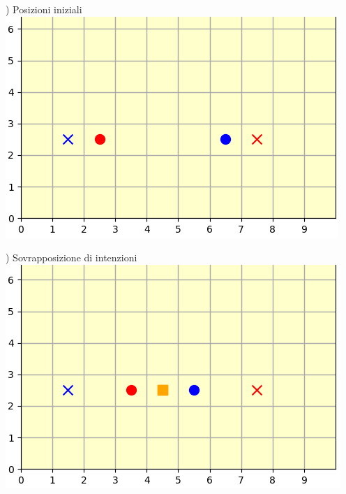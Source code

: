 \documentclass[12pt]{article}
\begin{document}
\begin{minipage}[ht]{0.45\linewidth}
) Posizioni iniziali
\includegraphics[width=\textwidth]{SimulazioniNavigazione/2AGV_ConflittoStandard/0.png}
\end{minipage}
\begin{minipage}[ht]{0.45\linewidth}
) Sovrapposizione di intenzioni
\includegraphics[width=\textwidth]{SimulazioniNavigazione/2AGV_ConflittoStandard/1.png}
\end{minipage}\\

\vspace{1cm}
\end{document}
